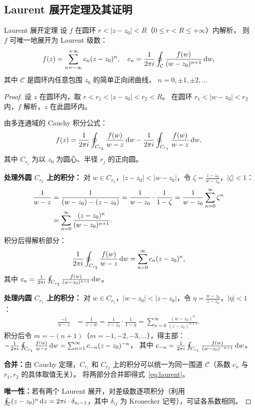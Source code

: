 \subsection{Laurent 展开定理及其证明}

\begin{theorem}{Laurent 展开定理}{}
\label{thm:laurent}
设 $f$ 在圆环 $r<|z-z_0|<R$（$0\le r<R\le+\infty$）内解析，
则 $f$ 可唯一地展开为 Laurent 级数：
\begin{equation}
    f(z) = \sum_{n=-\infty}^{+\infty} c_n(z-z_0)^n,
    \quad
    c_n = \frac{1}{2\pi i}\oint_{\mathcal{C}}\frac{f(w)}{(w-z_0)^{n+1}}\,\mathrm{d} w,
  \label{eq:laurent}
\end{equation}
其中 $\mathcal{C}$ 是圆环内任意包围 $z_0$ 的简单正向闭曲线，
$n=0,\pm1,\pm2,\ldots$
\end{theorem}

\begin{proof}
设 $z$ 在圆环内，取 $r<r_1<|z-z_0|<r_2<R$。
在圆环 $r_1<|w-z_0|<r_2$ 内，$f$ 解析，$z$ 在此圆环内。

由多连通域的 Cauchy 积分公式：
\begin{equation}
  f(z) = \frac{1}{2\pi i}\oint_{C_{r_2}}\frac{f(w)}{w-z}\,\mathrm{d} w
        -\frac{1}{2\pi i}\oint_{C_{r_1}}\frac{f(w)}{w-z}\,\mathrm{d} w,
  \label{eq:laurent_proof_1}
\end{equation}
其中 $C_{r_j}$ 为以 $z_0$ 为圆心、半径 $r_j$ 的正向圆。

\textbf{处理外圆 $C_{r_2}$ 上的积分：}
对 $w\in C_{r_2}$，$|z-z_0|<|w-z_0|$，令 $\zeta=\frac{z-z_0}{w-z_0}$，$|\zeta|<1$：
\begin{align}
  \frac{1}{w-z}
  &= \frac{1}{(w-z_0)-(z-z_0)}
  = \frac{1}{w-z_0}\cdot\frac{1}{1-\zeta}
  = \frac{1}{w-z_0}\sum_{n=0}^\infty\zeta^n
  \notag\\
  &= \sum_{n=0}^\infty\frac{(z-z_0)^n}{(w-z_0)^{n+1}}.
  \label{eq:geom_outer}
\end{align}
积分后得解析部分：
\[
\frac{1}{2\pi i}\oint_{C_{r_2}}\frac{f(w)}{w-z}\,\mathrm{d} w
 = \sum_{n=0}^\infty c_n(z-z_0)^n,
\]
其中 $c_n=\frac{1}{2\pi i}\oint_{C_{r_2}}\frac{f(w)}{(w-z_0)^{n+1}}\,\mathrm{d} w$。

\textbf{处理内圆 $C_{r_1}$ 上的积分：}
对 $w\in C_{r_1}$，$|w-z_0|<|z-z_0|$，令 $\eta=\frac{w-z_0}{z-z_0}$，$|\eta|<1$：
\begin{align}
  \frac{-1}{w-z}
  &= \frac{1}{z-w}
  = \frac{1}{z-z_0}\cdot\frac{1}{1-\eta}
  = \sum_{n=0}^\infty\frac{(w-z_0)^n}{(z-z_0)^{n+1}}.
  \label{eq:geom_inner}
\end{align}
积分后令 $m=-(n+1)$（$m=-1,-2,-3,\ldots$），得主部：
$ -\frac{1}{2\pi i}\oint_{C_{r_1}}\frac{f(w)}{w-z}\,\mathrm{d} w
 = \sum_{n=1}^\infty c_{-n}(z-z_0)^{-n}$，
其中 $ c_{-n}=\frac{1}{2\pi i}\oint_{C_{r_1}}\frac{f(w)}{(w-z_0)^{-n+1}}\,\mathrm{d} w$。

\textbf{合并：}由 Cauchy 定理，$C_{r_1}$ 和 $C_{r_2}$ 上的积分可以统一为同一围道 $\mathcal{C}$（系数 $c_n$ 与 $r_1,r_2$ 的具体取值无关）。
将两部分合并即得式~\eqref{eq:laurent}。

\textbf{唯一性：}若有两个 Laurent 展开，对差级数逐项积分（利用 $\oint_\mathcal{C}(z-z_0)^n\,\mathrm{d} z=2\pi i\cdot\delta_{n,-1}$，其中 $\delta_{ij}$ 为 Kronecker 记号），可证各系数相同。
\end{proof}

